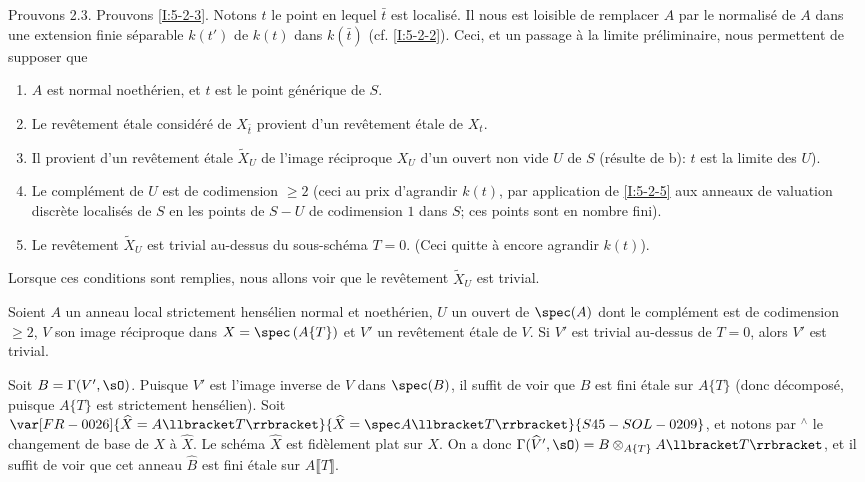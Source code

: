 \begingroup
\renewcommand*{\thesubsubsection}{2.3.3}
\begin{sourcebareinline}\label{I:5-2-6} %
Prouvons 2.3. Prouvons \ref{I:5-2-3}. Notons $t$ le point en lequel $\bar t$ est localisé. Il nous est loisible de 
remplacer $A$ par le normalisé de $A$ dans une extension finie séparable 
$k(t')$ de $k(t)$ dans $k(\bar t)$ (cf. \ref{I:5-2-2}). Ceci, et un passage à 
la limite préliminaire, nous permettent de supposer que 
\begin{enumerate}[\indent a)]
  \item $A$ est normal noethérien, et $t$ est le point générique de $S$.
  \item Le revêtement étale considéré de $X_{\bar t}$ provient d'un 
    revêtement étale de $X_t$. 
  \item Il provient d'un revêtement étale $\widetilde X_U$ de l'image 
    réciproque $X_U$ d'un ouvert non vide $U$ de $S$ (résulte de b): $t$ 
    est la limite des $U$).
  \item Le complément de $U$ est de codimension $\geqslant 2$ (ceci au prix 
    d'agrandir $k(t)$, par application de \ref{I:5-2-5} aux anneaux de 
    valuation discrète localisés de $S$ en les points de $S-U$ de 
    codimension $1$ dans $S$; ces points sont en nombre fini). 
  \item Le revêtement $\widetilde X_U$ est trivial au-dessus du sous-schéma 
    $T=0$. (Ceci quitte à encore agrandir $k(t)$). 
\end{enumerate}
\end{sourcebareinline}
\endgroup

Lorsque ces conditions sont remplies, nous allons voir que le revêtement 
$\widetilde X_U$ est trivial. 





\begingroup
\renewcommand*{\thesubsubsection}{2.3.4}
\begin{lemmadotdash}\label{I:5-2-7} %
Soient $A$ un anneau local strictement hensélien normal et noethérien, $U$ 
un ouvert de $\spec(A)$ dont le complément est de codimension $\geqslant 2$, 
$V$ son image réciproque dans $X=\spec\left(A\{T\}\right)$ et $V'$ un 
revêtement étale de $V$. Si $V'$ est trivial au-dessus de $T=0$, alors $V'$ 
est trivial. 
\end{lemmadotdash}
\endgroup

Soit $B=\Gamma(V',\sO)$. Puisque $V'$ est l'image inverse de $V$ dans 
$\spec(B)$, il suffit de voir que $B$ est fini étale sur $A\{T\}$ (donc 
décomposé, puisque $A\{T\}$ est strictement hensélien). Soit 
$\var[FR-0026]{\widehat X=A\llbracket T\rrbracket}{\widehat X=\spec A\llbracket T\rrbracket}{S45-SOL-0209}$, et notons par ${}^\wedge$ le changement 
de base de $X$ à $\widehat X$. Le schéma $\widehat X$ est fidèlement plat 
sur $X$. On a donc 
$\Gamma(\widehat V',\sO) = B\otimes_{A\{T\}} A\llbracket T\rrbracket$, et il 
suffit de voir que cet anneau $\widehat B$ est fini étale sur 
$A\llbracket T\rrbracket$. 

